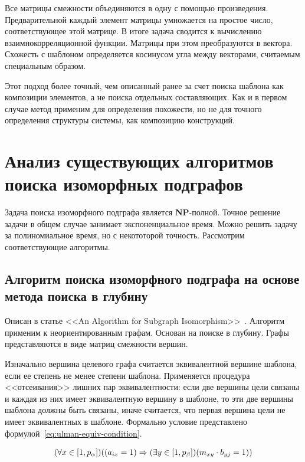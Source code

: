 Все матрицы смежности объединяются в одну с помощью произведения.
Предварительной каждый элемент матрицы умножается на простое число,
соответствующее этой матрице.
В итоге задача сводится к вычислению взаимнокорреляционной функции.
Матрицы при этом преобразуются в вектора.
Схожесть с шаблоном определяется косинусом угла между векторами,
считаемым специальным образом.

Этот подход более точный, чем описанный ранее за счет поиска шаблона как композиции
элементов, а не поиска отдельных составляющих.
Как и в первом случае метод применим для определения похожести,
но не для точного определения структуры системы, как композицию конструкций.

\section{Анализ существующих алгоритмов поиска изоморфных подграфов}

Задача поиска изоморфного подграфа является \textbf{NP}-полной.
Точное решение задачи в общем случае занимает экспоненциальное время.
Можно решить задачу за полиномиальное время, но с некототорой точность.
Рассмотрим соответствующие алгоритмы.

\subsection{Алгоритм поиска изоморфного подграфа на основе метода поиска в глубину}

Описан в статье <<An Algorithm for Subgraph Isomorphism>>~\cite{SubgraphIsomorphism}.
Алгоритм применим к неориентированным графам.
Основан на поиске в глубину.
Графы представляются в виде матриц смежности вершин.

Изначально вершина целевого графа считается эквивалентной вершине шаблона, если
ее степень не менее степени шаблона.
Применяется процедура <<отсеивания>> лишних пар эквивалентности:
если две вершины цели связаны и каждая из них имеет эквивалентную вершину в шаблоне,
то эти две вершины шаблона должны быть связаны, иначе считается, что первая
вершина цели не имеет эквивалентных в шаблоне.
Формально условие представлено формулой~\ref{eq:ulman-equiv-condition}.

\begin{equation} \label{eq:ulman-equiv-condition}
(\forall x \in [1, p_\alpha]) ( (a_{ix} = 1) \Rightarrow (\exists y \in [1, p_\beta]) (m_{xy} \cdot b_{yj} = 1) )
\end{equation}

